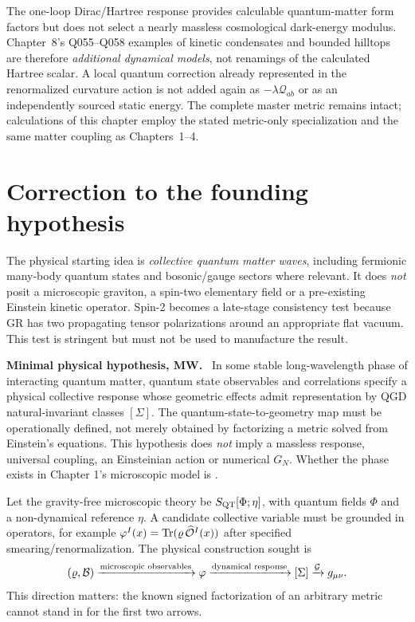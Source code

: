 \documentclass[11pt,a4paper]{article}
\theoremstyle{remark}\newtheorem{remark}[theorem]{Remark}
\begin{document}
The one-loop Dirac/Hartree response provides calculable quantum-matter form factors but does not select a nearly massless cosmological dark-energy modulus. Chapter~8's Q055--Q058 examples of kinetic condensates and bounded hilltops are therefore \emph{additional dynamical models}, not renamings of the calculated Hartree scalar. A local quantum correction already represented in the renormalized curvature action is not added again as $-\lambda\mathcal Q_{ab}$ or as an independently sourced static energy. The complete master metric remains intact; calculations of this chapter employ the stated metric-only specialization and the same matter coupling as Chapters~1--4.


\section{Correction to the founding hypothesis}
The physical starting idea is \emph{collective quantum matter waves}, including fermionic many-body quantum states and bosonic/gauge sectors where relevant. It does \emph{not} posit a microscopic graviton, a spin-two elementary field or a pre-existing Einstein kinetic operator. Spin-2 becomes a late-stage consistency test because GR has two propagating tensor polarizations around an appropriate flat vacuum. This test is stringent but must not be used to manufacture the result.

\textbf{Minimal physical hypothesis, MW.} \AX\ In some stable long-wavelength phase of interacting quantum matter, quantum state observables and correlations specify a physical collective response whose geometric effects admit representation by QGD natural-invariant classes $[\Sigma]$. The quantum-state-to-geometry map must be operationally defined, not merely obtained by factorizing a metric solved from Einstein's equations. This hypothesis does \emph{not} imply a massless response, universal coupling, an Einsteinian action or numerical $G_N$. Whether the phase exists in Chapter 1's microscopic model is \OPEN.

Let the gravity-free microscopic theory be $S_{\rm QT}[\Phi;\eta]$, with quantum fields $\Phi$ and a non-dynamical reference $\eta$. A candidate collective variable must be grounded in operators, for example $\varphi^I(x)=\operatorname{Tr}(\varrho\,\widehat{\mathcal O}^I(x))$ after specified smearing/renormalization. The physical construction sought is
\begin{equation}\label{eq:map}
 (\varrho,\mathcal B)\xrightarrow{\text{microscopic observables}}\varphi
 \xrightarrow{\text{dynamical response}}[\Sigma]
 \xrightarrow{\mathcal G}g_{\mu\nu}.
\end{equation}
This direction matters: the known signed factorization of an arbitrary metric cannot stand in for the first two arrows.
\end{document}
